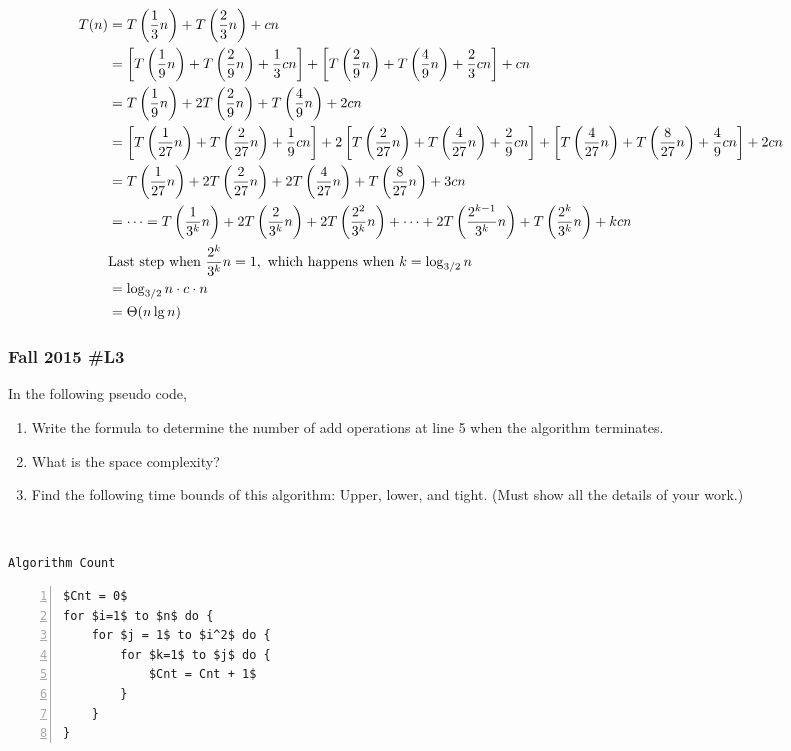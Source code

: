 \begin{align*}
	T(n) &= T\left( \frac{1}{3} n \right) + T \left( \frac{2}{3} n \right) + cn \cr
	&= \left[ T\left( \frac{1}{9} n \right) + T \left( \frac{2}{9} n \right) + \frac{1}{3}cn\right] + \left[ T\left( \frac{2}{9} n \right) + T \left( \frac{4}{9} n \right) + \frac{2}{3}cn\right] + cn \cr
	&= T\left( \frac{1}{9} n \right) + 2T\left( \frac{2}{9} n \right) + T\left( \frac{4}{9} n \right) + 2cn \cr
	&= \left[ T\left( \frac{1}{27} n \right) + T \left( \frac{2}{27} n \right) + \frac{1}{9}cn\right] + 
	2\left[ T\left( \frac{2}{27} n \right) + T \left( \frac{4}{27} n \right) + \frac{2}{9}cn\right] + 
	\left[ T\left( \frac{4}{27} n \right) + T \left( \frac{8}{27} n \right) + \frac{4}{9}cn\right] + 2cn \cr	
	&= T\left( \frac{1}{27} n \right) + 2 T\left( \frac{2}{27} n \right) + 2T\left( \frac{4}{27} n \right) + T\left( \frac{8}{27} n \right) + 3cn \cr
	&= \cdots = T\left( \frac{1}{3^k} n \right) + 2T\left( \frac{2}{3^k} n \right) + 2T\left( \frac{2^2}{3^k} n \right) + \cdots + 2T\left( \frac{2^{k-1}}{3^k} n \right) +  T\left( \frac{2^k}{3^k} n \right) + kcn \cr
	& \text{Last step when } \frac{2^k}{3^k}n=1, \text{ which happens when } k = \log_{3/2}n \cr
	&= \log_{3/2}n \cdot c \cdot n \cr
	&= \Theta ( n \lg n) \cr
\end{align*}

\subsubsection{Fall 2015 \#L3}	
	In the following pseudo code, 
	\begin{enumerate}[label=\alph*.]
		\item Write the formula to determine the number of add operations at line 5 when the algorithm terminates.  
		\item What is the space complexity?
		\item Find the following time bounds of this algorithm:  Upper, lower, and tight. (Must show all the details of your work.)
	\end{enumerate}
	
	\
	
	\verb|Algorithm Count|
	
	\begin{lstlisting}[numbers=left, mathescape=true]
$Cnt = 0$
for $i=1$ to $n$ do {
	for $j = 1$ to $i^2$ do {
		for $k=1$ to $j$ do {
			$Cnt = Cnt + 1$
		}
	}
}
	\end{lstlisting}
	
